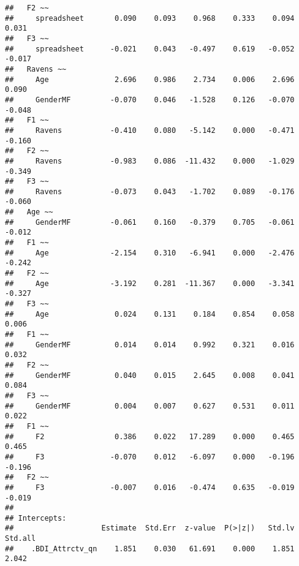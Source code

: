 \documentclass[]{article}
\begin{document}
\begin{verbatim}
##   F2 ~~                                                                 
##     spreadsheet       0.090    0.093    0.968    0.333    0.094    0.031
##   F3 ~~                                                                 
##     spreadsheet      -0.021    0.043   -0.497    0.619   -0.052   -0.017
##   Ravens ~~                                                             
##     Age               2.696    0.986    2.734    0.006    2.696    0.090
##     GenderMF         -0.070    0.046   -1.528    0.126   -0.070   -0.048
##   F1 ~~                                                                 
##     Ravens           -0.410    0.080   -5.142    0.000   -0.471   -0.160
##   F2 ~~                                                                 
##     Ravens           -0.983    0.086  -11.432    0.000   -1.029   -0.349
##   F3 ~~                                                                 
##     Ravens           -0.073    0.043   -1.702    0.089   -0.176   -0.060
##   Age ~~                                                                
##     GenderMF         -0.061    0.160   -0.379    0.705   -0.061   -0.012
##   F1 ~~                                                                 
##     Age              -2.154    0.310   -6.941    0.000   -2.476   -0.242
##   F2 ~~                                                                 
##     Age              -3.192    0.281  -11.367    0.000   -3.341   -0.327
##   F3 ~~                                                                 
##     Age               0.024    0.131    0.184    0.854    0.058    0.006
##   F1 ~~                                                                 
##     GenderMF          0.014    0.014    0.992    0.321    0.016    0.032
##   F2 ~~                                                                 
##     GenderMF          0.040    0.015    2.645    0.008    0.041    0.084
##   F3 ~~                                                                 
##     GenderMF          0.004    0.007    0.627    0.531    0.011    0.022
##   F1 ~~                                                                 
##     F2                0.386    0.022   17.289    0.000    0.465    0.465
##     F3               -0.070    0.012   -6.097    0.000   -0.196   -0.196
##   F2 ~~                                                                 
##     F3               -0.007    0.016   -0.474    0.635   -0.019   -0.019
## 
## Intercepts:
##                    Estimate  Std.Err  z-value  P(>|z|)   Std.lv  Std.all
##    .BDI_Attrctv_qn    1.851    0.030   61.691    0.000    1.851    2.042

\end{verbatim}
\end{document}
